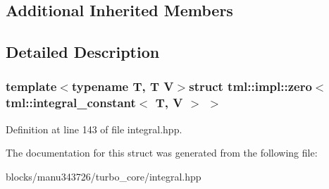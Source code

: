 \subsection*{Additional Inherited Members}


\subsection{Detailed Description}
\subsubsection*{template$<$typename T, T V$>$struct tml\+::impl\+::zero$<$ tml\+::integral\+\_\+constant$<$ T, V $>$ $>$}



Definition at line 143 of file integral.\+hpp.



The documentation for this struct was generated from the following file\+:\begin{DoxyCompactItemize}
\item 
blocks/manu343726/turbo\+\_\+core/integral.\+hpp\end{DoxyCompactItemize}
